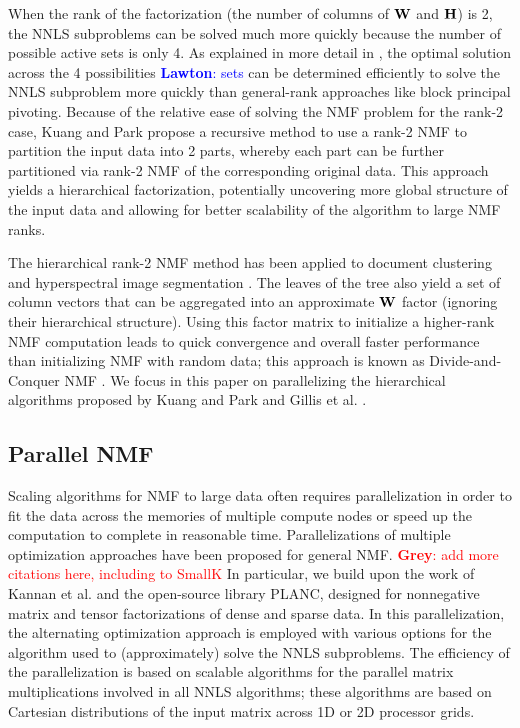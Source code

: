 \documentclass[conference,compsoc]{IEEEtran}
\newcommand{\LM}[1]{\textcolor{blue}{\textbf{Lawton}: #1}}
\newcommand{\GB}[1]{\textcolor{red}{\textbf{Grey}: #1}}
\begin{document}
When the rank of the factorization (the number of columns of $\M{W}$ and $\M{H}$) is 2, the NNLS subproblems can be solved much more quickly because the number of possible active sets is only 4.
As explained in more detail in , the optimal solution across the 4 possibilities \LM{sets} can be determined efficiently to solve the NNLS subproblem more quickly than general-rank approaches like block principal pivoting.
Because of the relative ease of solving the NMF problem for the rank-2 case, Kuang and Park \cite{KP13} propose a recursive method to use a rank-2 NMF to partition the input data into 2 parts, whereby each part can be further partitioned via rank-2 NMF of the corresponding original data.
This approach yields a hierarchical factorization, potentially uncovering more global structure of the input data and allowing for better scalability of the algorithm to large NMF ranks.

The hierarchical rank-2 NMF method has been applied to document clustering \cite{KP13} and hyperspectral image segmentation \cite{GKP15}.
The leaves of the tree also yield a set of column vectors that can be aggregated into an approximate $\M{W}$ factor (ignoring their hierarchical structure).
Using this factor matrix to initialize a higher-rank NMF computation leads to quick convergence and overall faster performance than initializing NMF with random data; this approach is known as Divide-and-Conquer NMF \cite{DKDP17}.
We focus in this paper on parallelizing the hierarchical algorithms proposed by Kuang and Park \cite{KP13} and Gillis et al. \cite{GKP15}.

\subsection{Parallel NMF}

Scaling algorithms for NMF to large data often requires parallelization in order to fit the data across the memories of multiple compute nodes or speed up the computation to complete in reasonable time.
Parallelizations of multiple optimization approaches have been proposed for general NMF. \GB{add more citations here, including to SmallK}
In particular, we build upon the work of Kannan et al. \cite{KBP16,KBP17,EH+19-TR} and the open-source library PLANC, designed for nonnegative matrix and tensor factorizations of dense and sparse data.
In this parallelization, the alternating optimization approach is employed with various options for the algorithm used to (approximately) solve the NNLS subproblems.
The efficiency of the parallelization is based on scalable algorithms for the parallel matrix multiplications involved in all NNLS algorithms; these algorithms are based on Cartesian distributions of the input matrix across 1D or 2D processor grids.
\end{document}
